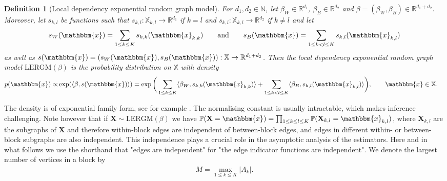 \documentclass{article}
\newtheorem{Definition}[Theorem]{Definition}
\begin{document}
\begin{Definition}[Local dependency exponential random graph model]
    For $d_1,d_2 \in \mathbb{N}$, let $\beta_W \in \mathbb{R}^{d_1}$, $\beta_B \in \mathbb{R}^{d_2}$ and $ \beta = (\beta_W,\beta_B) \in \mathbb{R}^{d_1+d_2}$. Moreover, let $s_{k,l}$ be functions such that $s_{k,l}:\mathbb{X}_{k,l} \rightarrow \mathbb{R}^{d_1}$ if $k=l$ and $s_{k,l}:\mathbb{X}_{k,l} \rightarrow \mathbb{R}^{d_2}$ if $k \neq l$ and let
    \begin{align*}
        s_W(\mathbbm{x}) = \sum_{1\leq k \leq K} s_{k,k}(\mathbbm{x}_{k,k}) \qquad \text{and} \qquad s_B(\mathbbm{x}) = \sum_{1\leq k <l \leq K} s_{k,l}(\mathbbm{x}_{k,l})
    \end{align*}
    as well as $s(\mathbbm{x}) = (s_W(\mathbbm{x}),s_B(\mathbbm{x})): \mathbb{X} \rightarrow \mathbb{R}^{d_1 + d_2} $. Then the local dependency exponential random graph model $\mathrm{LERGM}(\beta)$ is the probability distribution on $\mathbb{X}$ with density
    \begin{align*}
        p(\mathbbm{x}) \propto & \exp(\langle \beta, s(\mathbbm{x}) \rangle )  =  \exp \bigg(  \sum_{1\leq k \leq K} \langle \beta_W, s_{k,k}(\mathbbm{x}_{k,k}) \rangle  + \sum_{1\leq k <l \leq K} \langle \beta_B, s_{k,l}(\mathbbm{x}_{k,l}) \rangle \bigg), \qquad \mathbbm{x} \in \mathbb{X}.
    \end{align*}  
\end{Definition}
The density is of exponential family form, see for example \cite{sundberg2019statistical}. The normalising constant is usually intractable, which makes inference challenging. Note however that if $\mathbf{X} \sim \mathrm{LERGM}(\beta)$ we have $\mathbb{P}(\mathbf{X} = \mathbbm{x}) = \prod_{1 \leq k \leq l \leq K} \mathbb{P}(\mathbf{X}_{k,l} = \mathbbm{x}_{k,l} )$, where $\mathbf{X}_{k,l} $ are the subgraphs of $\mathbf{X}$ and therefore within-block edges are independent of between-block edges,  and edges in different within- or between-block subgraphs are also independent. This independence plays a crucial role in the asymptotic analysis of the estimators. Here and in what follows we use the shorthand that "edges are independent" for "the edge indicator functions are independent". 
We denote the largest number of vertices in a block by
\begin{align} \label{maximum_nb_vertices}
    M = \max_{1\leq k \leq K} \vert A_k \vert . 
\end{align}
\end{document}
